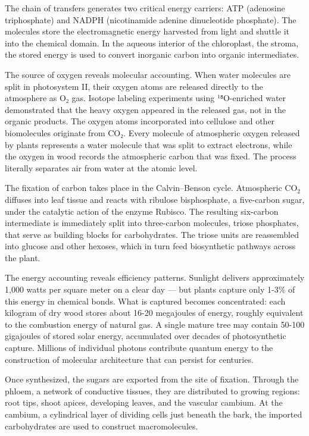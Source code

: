 The chain of transfers generates two critical energy carriers: ATP (adenosine triphosphate) and NADPH (nicotinamide adenine dinucleotide phosphate). The molecules store the electromagnetic energy harvested from light and shuttle it into the chemical domain. In the aqueous interior of the chloroplast, the stroma, the stored energy is used to convert inorganic carbon into organic intermediates.

The source of oxygen reveals molecular accounting. When water molecules are split in photosystem II, their oxygen atoms are released directly to the atmosphere as O₂ gas. Isotope labeling experiments using ¹⁸O-enriched water demonstrated that the heavy oxygen appeared in the released gas, not in the organic products. The oxygen atoms incorporated into cellulose and other biomolecules originate from CO₂. Every molecule of atmospheric oxygen released by plants represents a water molecule that was split to extract electrons, while the oxygen in wood records the atmospheric carbon that was fixed. The process literally separates air from water at the atomic level.

The fixation of carbon takes place in the Calvin–Benson cycle. Atmospheric \(\mathrm{CO}_2\) diffuses into leaf tissue and reacts with ribulose bisphosphate, a five-carbon sugar, under the catalytic action of the enzyme Rubisco. The resulting six-carbon intermediate is immediately split into three-carbon molecules, triose phosphates, that serve as building blocks for carbohydrates. The triose units are reassembled into glucose and other hexoses, which in turn feed biosynthetic pathways across the plant.

The energy accounting reveals efficiency patterns. Sunlight delivers approximately 1,000 watts per square meter on a clear day — but plants capture only 1-3\% of this energy in chemical bonds. What is captured becomes concentrated: each kilogram of dry wood stores about 16-20 megajoules of energy, roughly equivalent to the combustion energy of natural gas. A single mature tree may contain 50-100 gigajoules of stored solar energy, accumulated over decades of photosynthetic capture. Millions of individual photons contribute quantum energy to the construction of molecular architecture that can persist for centuries.

Once synthesized, the sugars are exported from the site of fixation. Through the phloem, a network of conductive tissues, they are distributed to growing regions: root tips, shoot apices, developing leaves, and the vascular cambium. At the cambium, a cylindrical layer of dividing cells just beneath the bark, the imported carbohydrates are used to construct macromolecules.


